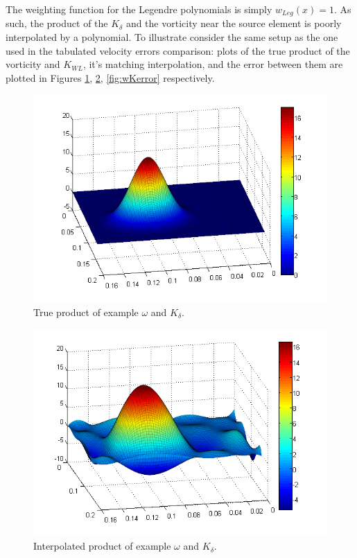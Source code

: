 \documentclass[letterpaper,12pt]{report}
\begin{document}
The weighting function for the Legendre polynomials is simply $w_{Leg}(x)=1$. As such, the product of the $K_{\delta}$ and the vorticity near the source element is poorly interpolated by a polynomial. To illustrate consider the same setup as the one used in the tabulated velocity errors comparison: plots of the true product of the vorticity and $K_{WL}$, it's matching interpolation, and the error between them are plotted in Figures \ref{fig:wKtrue}, \ref{fig:wKinterp}, \ref{fig:wKerror} respectively.

\begin{figure}
\centering
\includegraphics[width=5.5in]{wKtrue.PNG}
\caption{\label{fig:wKtrue}True product of example $\omega$ and $K_{\delta}$.}
\end{figure}
\begin{figure}
\centering
\includegraphics[width=5.5in]{wKinterp.PNG}
\caption{\label{fig:wKinterp}Interpolated product of example $\omega$ and $K_{\delta}$.}
\end{figure}
\end{document}
